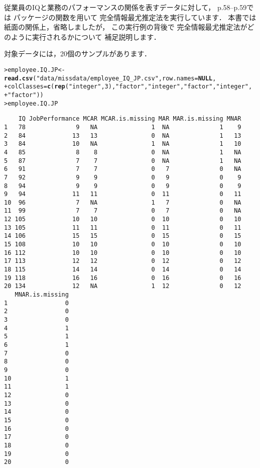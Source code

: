 \documentclass[a4j]{jarticle}\usepackage[]{graphicx}\usepackage[]{color}
\makeatletter
\newcommand{\hlnum}[1]{\textcolor[rgb]{0.686,0.059,0.569}{#1}}%
\newcommand{\hlstr}[1]{\textcolor[rgb]{0.192,0.494,0.8}{#1}}%
\newcommand{\hlstd}[1]{\textcolor[rgb]{0.345,0.345,0.345}{#1}}%
\newcommand{\hlkwa}[1]{\textcolor[rgb]{0.161,0.373,0.58}{\textbf{#1}}}%
\newcommand{\hlkwb}[1]{\textcolor[rgb]{0.69,0.353,0.396}{#1}}%
\newcommand{\hlkwc}[1]{\textcolor[rgb]{0.333,0.667,0.333}{#1}}%
\newcommand{\hlkwd}[1]{\textcolor[rgb]{0.737,0.353,0.396}{\textbf{#1}}}%
\newenvironment{kframe}{%
 \def\at@end@of@kframe{}%
 \ifinner\ifhmode%
  \def\at@end@of@kframe{\end{minipage}}%
  \begin{minipage}{\columnwidth}%
 \fi\fi%
 \def\FrameCommand##1{\hskip\@totalleftmargin \hskip-\fboxsep
 \colorbox{shadecolor}{##1}\hskip-\fboxsep
     \hskip-\linewidth \hskip-\@totalleftmargin \hskip\columnwidth}%
 \MakeFramed {\advance\hsize-\width
   \@totalleftmargin\z@ \linewidth\hsize
   \@setminipage}}%
 {\par\unskip\endMakeFramed%
 \at@end@of@kframe}
\newenvironment{knitrout}{}{} %
\makeatother
\begin{document}
従業員のIQと業務のパフォーマンスの関係を表すデータに対して，
p.58--p.59では
パッケージの関数を用いて
完全情報最尤推定法を実行しています．
本書では紙面の関係上，省略しましたが，
この実行例の背後で
完全情報最尤推定法がどのように実行されるかについて
補足説明します．

対象データには，20個のサンプルがあります．
\begin{knitrout}
\color{fgcolor}\begin{kframe}
\begin{alltt}
\hlstd{> }\hlstd{employee.IQ.JP} \hlkwb{<-} \hlkwd{read.csv}\hlstd{(}\hlstr{"data/missdata/employee_IQ_JP.csv"}\hlstd{,} \hlkwc{row.names}\hlstd{=}\hlkwa{NULL}\hlstd{,}
\hlstd{+ }  \hlkwc{colClasses}\hlstd{=}\hlkwd{c}\hlstd{(}\hlkwd{rep}\hlstd{(}\hlstr{"integer"}\hlstd{,} \hlnum{3}\hlstd{),} \hlstr{"factor"}\hlstd{,} \hlstr{"integer"}\hlstd{,} \hlstr{"factor"}\hlstd{,} \hlstr{"integer"}\hlstd{,}
\hlstd{+ }               \hlstr{"factor"}\hlstd{))}
\hlstd{> }\hlstd{employee.IQ.JP}
\end{alltt}
\begin{verbatim}
    IQ JobPerformance MCAR MCAR.is.missing MAR MAR.is.missing MNAR
1   78              9   NA               1  NA              1    9
2   84             13   13               0  NA              1   13
3   84             10   NA               1  NA              1   10
4   85              8    8               0  NA              1   NA
5   87              7    7               0  NA              1   NA
6   91              7    7               0   7              0   NA
7   92              9    9               0   9              0    9
8   94              9    9               0   9              0    9
9   94             11   11               0  11              0   11
10  96              7   NA               1   7              0   NA
11  99              7    7               0   7              0   NA
12 105             10   10               0  10              0   10
13 105             11   11               0  11              0   11
14 106             15   15               0  15              0   15
15 108             10   10               0  10              0   10
16 112             10   10               0  10              0   10
17 113             12   12               0  12              0   12
18 115             14   14               0  14              0   14
19 118             16   16               0  16              0   16
20 134             12   NA               1  12              0   12
   MNAR.is.missing
1                0
2                0
3                0
4                1
5                1
6                1
7                0
8                0
9                0
10               1
11               1
12               0
13               0
14               0
15               0
16               0
17               0
18               0
19               0
20               0
\end{verbatim}
\end{kframe}
\end{knitrout}
\end{document}

